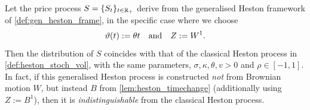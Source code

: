 \begin{theorem}\label{thm:heston_ode}
    Let the price process $S=\{S_t\}_{t\in\mathbb{R}_+}$ derive from the generalised Heston framework of \autoref{def:gen_heston_frame}, in the specific case where we choose
    \begin{equation}\label{eq:heston_field}
        \vartheta(t) := \theta t\quad\text{and}\quad Z:=W^1.
    \end{equation}
    Then the distribution of $S$ coincides with that of the classical Heston process in \autoref{def:heston_stoch_vol}, with the same parameters, $\sigma,\kappa,\theta,v>0$ and $\rho\in[-1,1]$. In fact, if this generalised Heston process is constructed \emph{not} from Brownian motion $W$, but instead $B$ from \autoref{lem:heston_timechange} (additionally using $Z:=B^1$), then it is \emph{indistinguishable} from the classical Heston process.
\end{theorem}
